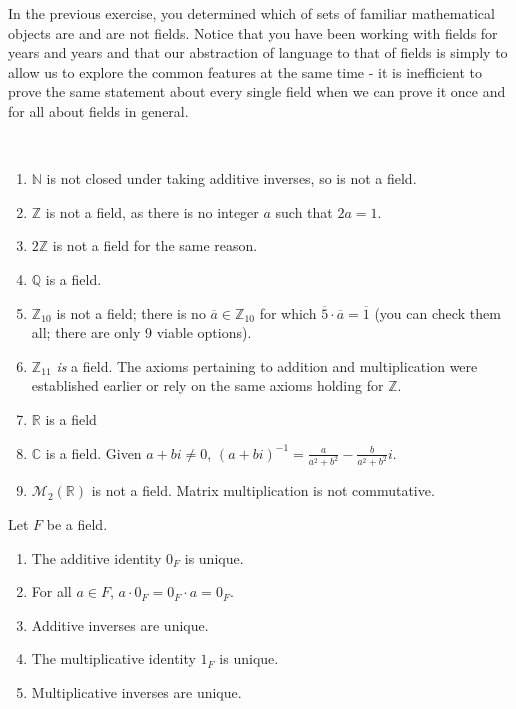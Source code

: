 \documentclass[english,course]{lecture}
\newenvironment{solution}[1][Solution]{\begin{trivlist}\pushQED{\qed}\item[\hskip \labelsep  \bfseries #1{}.\hspace{10pt}]}{\popQED\end{trivlist}}\renewcommand{\qedsymbol}{$\checkmark$}{\newenvironment{answer}{\renewcommand\qedsymbol{$\blacklozenge$}\begin{proof}[Answer]}{\end{proof}}}\newenvironment{answer}[1][Answer]{\begin{trivlist}\pushQED{\qed}\item[\hskip \labelsep  \bfseries #1{}.\hspace{10pt}]}{\popQED\end{trivlist}}\renewcommand{\qedsymbol}{$\lozenge$}
\newenvironment{facnote}{\startfacnote}{}
\def\startfacnote#1\end{\margintext{{\sc Note:} #1}\end}
\theoremstyle{plain}
\def\C{{\mathbb C}}
\def\Z{{\mathbb Z}}
\def\Q{{\mathbb Q}}
\def\N{{\mathbb N}}
\def\R{{\mathbb R}}
\def\presnotes{}
\begin{document}
In the previous exercise, you determined which of sets of familiar mathematical objects are and are not fields. Notice that you have been working with fields for years and years and that our abstraction of language to that of fields is simply to allow us to explore the common features at the same time - it is inefficient to prove the same statement about every single field when we can prove it once and for all about fields in general.

\begin{solution}
\
	\begin{enumerate}
		\item $\N$ is not closed under taking additive inverses, so is not a field.
		\item $\Z$ is not a field, as there is no integer $a$ such that $2a = 1$.
		\item $2\Z$ is not a field for the same reason.
		\item $\Q$ is a field.
		\item $\Z_{10}$ is not a field; there is no $\overline{a}\in \Z_{10}$ for which $\overline{5}\cdot \overline{a} = \overline{1}$ (you can check them all; there are only 9 viable options).
		\item $\Z_{11}$ \emph{is} a field. The axioms pertaining to addition and multiplication were established earlier or rely on the same axioms holding for $\Z$. %
		\item $\R$ is a field
		\item $\C$ is a field. Given $a+bi\ne 0$, $(a+bi)^{-1} = \frac{a}{a^2 + b^2} - \frac{b}{a^2 + b^2} i$.
		\item $\mathcal{M}_2(\R)$ is not a field. Matrix multiplication is not commutative.
	\end{enumerate}
\end{solution}

\presnotes

\begin{theorem}\label{thm:fieldproperties}
	Let $F$ be a field.
	\begin{enumerate}
		\item The additive identity $0_F$ is unique.
		\item For all $a\in F$, $a \cdot 0_F = 0_F\cdot  a = 0_F$.
		\item Additive inverses are unique.
		\item The multiplicative identity $1_F$ is unique.
		\item Multiplicative inverses are unique. 
	\end{enumerate}
\end{theorem}
\end{document}
